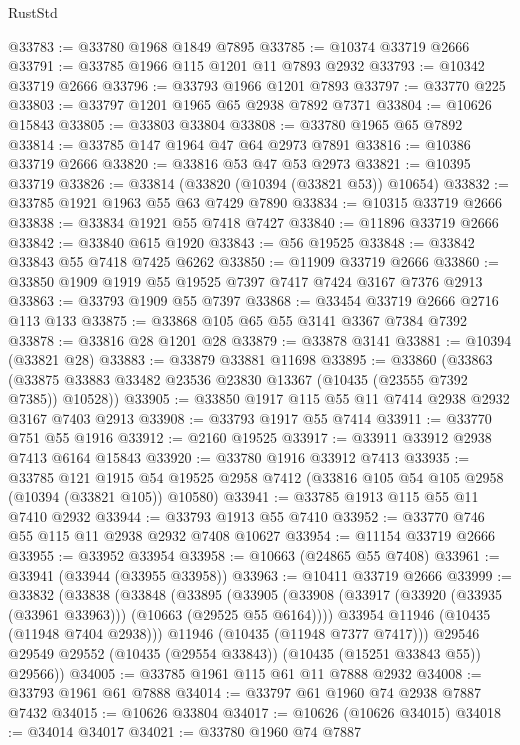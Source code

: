 \begin{lexlean}{RustStd}
\begin{coremodule}
@33783 := @33780 @1968 @1849 @7895
@33785 := @10374 @33719 @2666
@33791 := @33785 @1966 @115 @1201 @11 @7893 @2932
@33793 := @10342 @33719 @2666
@33796 := @33793 @1966 @1201 @7893
@33797 := @33770 @225
@33803 := @33797 @1201 @1965 @65 @2938 @7892 @7371
@33804 := @10626 @15843
@33805 := @33803 @33804
@33808 := @33780 @1965 @65 @7892
@33814 := @33785 @147 @1964 @47 @64 @2973 @7891
@33816 := @10386 @33719 @2666
@33820 := @33816 @53 @47 @53 @2973
@33821 := @10395 @33719
@33826 := @33814 (@33820 (@10394 (@33821 @53)) @10654)
@33832 := @33785 @1921 @1963 @55 @63 @7429 @7890
@33834 := @10315 @33719 @2666
@33838 := @33834 @1921 @55 @7418 @7427
@33840 := @11896 @33719 @2666
@33842 := @33840 @615 @1920
@33843 := @56 @19525
@33848 := @33842 @33843 @55 @7418 @7425 @6262
@33850 := @11909 @33719 @2666
@33860 := @33850 @1909 @1919 @55 @19525 @7397 @7417 @7424 @3167 @7376 @2913
@33863 := @33793 @1909 @55 @7397
@33868 := @33454 @33719 @2666 @2716 @113 @133
@33875 := @33868 @105 @65 @55 @3141 @3367 @7384 @7392
@33878 := @33816 @28 @1201 @28
@33879 := @33878 @3141
@33881 := @10394 (@33821 @28)
@33883 := @33879 @33881 @11698
@33895 := @33860
    (@33863 (@33875 @33883 @33482 @23536 @23830 @13367 (@10435 (@23555 @7392 @7385)) @10528))
@33905 := @33850 @1917 @115 @55 @11 @7414 @2938 @2932 @3167 @7403 @2913
@33908 := @33793 @1917 @55 @7414
@33911 := @33770 @751 @55 @1916
@33912 := @2160 @19525
@33917 := @33911 @33912 @2938 @7413 @6164 @15843
@33920 := @33780 @1916 @33912 @7413
@33935 := @33785
    @121
    @1915
    @54
    @19525
    @2958
    @7412
    (@33816 @105 @54 @105 @2958 (@10394 (@33821 @105)) @10580)
@33941 := @33785 @1913 @115 @55 @11 @7410 @2932
@33944 := @33793 @1913 @55 @7410
@33952 := @33770 @746 @55 @115 @11 @2938 @2932 @7408 @10627
@33954 := @11154 @33719 @2666
@33955 := @33952 @33954
@33958 := @10663 (@24865 @55 @7408)
@33961 := @33941 (@33944 (@33955 @33958))
@33963 := @10411 @33719 @2666
@33999 := @33832
    (@33838
      (@33848
        (@33895
          (@33905
            (@33908 (@33917 (@33920 (@33935 (@33961 @33963))) (@10663 (@29525 @55 @6164))))
            @33954
            @11946
            (@10435 (@11948 @7404 @2938)))
          @11946
          (@10435 (@11948 @7377 @7417)))
        @29546
        @29549
        @29552
        (@10435 (@29554 @33843))
        (@10435 (@15251 @33843 @55))
        @29566))
@34005 := @33785 @1961 @115 @61 @11 @7888 @2932
@34008 := @33793 @1961 @61 @7888
@34014 := @33797 @61 @1960 @74 @2938 @7887 @7432
@34015 := @10626 @33804
@34017 := @10626 (@10626 @34015)
@34018 := @34014 @34017
@34021 := @33780 @1960 @74 @7887

\end{coremodule}
\end{lexlean}
